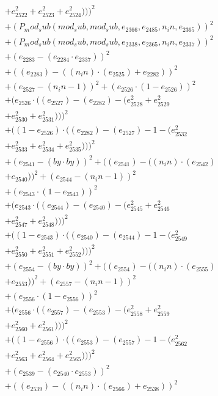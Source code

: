 \documentclass[10pt, a4paper]{article}
\begin{document}
\begin{small}
\begin{align*}
& + e_{2522}^{2} + e_{2523}^{2} + e_{2524}^{2})))^{2} \\
& + (P_mod_sub(mod_sub, mod_sub, e_{2366}, e_{2485}, n_in, e_{2365}))^{2} \\
& + (P_mod_sub(mod_sub, mod_sub, e_{2338}, e_{2365}, n_in, e_{2337}))^{2} \\
& + (e_{2283} - (e_{2284}  \cdot  e_{2337}))^{2} \\
& + ((e_{2283}) - ((n_in)  \cdot  (e_{2525}) + e_{2282}))^{2} \\
& + (e_{2527} - (n_in - 1))^{2} + (e_{2526}  \cdot  (1 - e_{2526}))^{2} \\
& + (e_{2526}  \cdot  ((e_{2527}) - (e_{2282}) - (e_{2528}^{2} + e_{2529}^{2} \\
& + e_{2530}^{2} + e_{2531}^{2})))^{2} \\
& + ((1 - e_{2526})  \cdot  ((e_{2282}) - (e_{2527}) - 1 - (e_{2532}^{2} \\
& + e_{2533}^{2} + e_{2534}^{2} + e_{2535}^{2})))^{2} \\
& + (e_{2541} - (by  \cdot  by))^{2} + ((e_{2541}) - ((n_in)  \cdot  (e_{2542}) \\
& + e_{2540}))^{2} + (e_{2544} - (n_in - 1))^{2} \\
& + (e_{2543}  \cdot  (1 - e_{2543}))^{2} \\
& + (e_{2543}  \cdot  ((e_{2544}) - (e_{2540}) - (e_{2545}^{2} + e_{2546}^{2} \\
& + e_{2547}^{2} + e_{2548}^{2})))^{2} \\
& + ((1 - e_{2543})  \cdot  ((e_{2540}) - (e_{2544}) - 1 - (e_{2549}^{2} \\
& + e_{2550}^{2} + e_{2551}^{2} + e_{2552}^{2})))^{2} \\
& + (e_{2554} - (by  \cdot  by))^{2} + ((e_{2554}) - ((n_in)  \cdot  (e_{2555}) \\
& + e_{2553}))^{2} + (e_{2557} - (n_in - 1))^{2} \\
& + (e_{2556}  \cdot  (1 - e_{2556}))^{2} \\
& + (e_{2556}  \cdot  ((e_{2557}) - (e_{2553}) - (e_{2558}^{2} + e_{2559}^{2} \\
& + e_{2560}^{2} + e_{2561}^{2})))^{2} \\
& + ((1 - e_{2556})  \cdot  ((e_{2553}) - (e_{2557}) - 1 - (e_{2562}^{2} \\
& + e_{2563}^{2} + e_{2564}^{2} + e_{2565}^{2})))^{2} \\
& + (e_{2539} - (e_{2540}  \cdot  e_{2553}))^{2} \\
& + ((e_{2539}) - ((n_in)  \cdot  (e_{2566}) + e_{2538}))^{2} \\

\end{align*}
\end{small}
\end{document}
